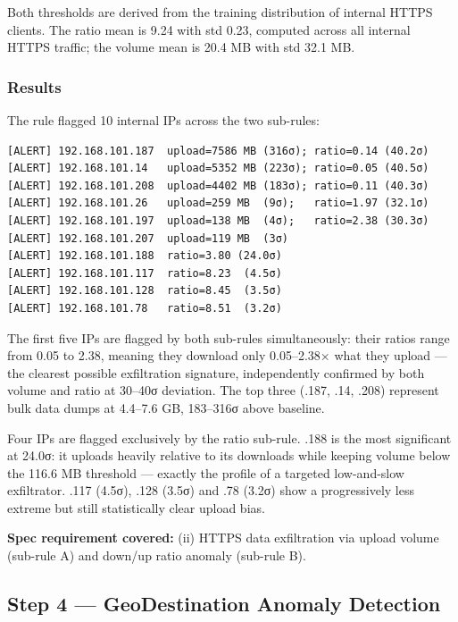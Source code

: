 \documentclass[
  11pt,
]{article}
\begin{document}
Both thresholds are derived from the training distribution of internal
HTTPS clients. The ratio mean is 9.24 with std 0.23, computed across all
internal HTTPS traffic; the volume mean is 20.4 MB with std 32.1 MB.

\subsubsection{Results}

The rule flagged 10 internal IPs across the two sub-rules:

\begin{verbatim}
[ALERT] 192.168.101.187  upload=7586 MB (316σ); ratio=0.14 (40.2σ)
[ALERT] 192.168.101.14   upload=5352 MB (223σ); ratio=0.05 (40.5σ)
[ALERT] 192.168.101.208  upload=4402 MB (183σ); ratio=0.11 (40.3σ)
[ALERT] 192.168.101.26   upload=259 MB  (9σ);   ratio=1.97 (32.1σ)
[ALERT] 192.168.101.197  upload=138 MB  (4σ);   ratio=2.38 (30.3σ)
[ALERT] 192.168.101.207  upload=119 MB  (3σ)
[ALERT] 192.168.101.188  ratio=3.80 (24.0σ)
[ALERT] 192.168.101.117  ratio=8.23  (4.5σ)
[ALERT] 192.168.101.128  ratio=8.45  (3.5σ)
[ALERT] 192.168.101.78   ratio=8.51  (3.2σ)
\end{verbatim}

The first five IPs are flagged by both sub-rules simultaneously: their
ratios range from 0.05 to 2.38, meaning they download only 0.05--2.38×
what they upload — the clearest possible exfiltration signature,
independently confirmed by both volume and ratio at 30--40σ deviation.
The top three (.187, .14, .208) represent bulk data dumps at 4.4--7.6 GB,
183--316σ above baseline.

Four IPs are flagged exclusively by the ratio sub-rule. .188 is the most
significant at 24.0σ: it uploads heavily relative to its downloads while
keeping volume below the 116.6 MB threshold — exactly the profile of a
targeted low-and-slow exfiltrator. .117 (4.5σ), .128 (3.5σ) and .78
(3.2σ) show a progressively less extreme but still statistically clear
upload bias.

\medskip
\noindent\colorbox{gray!12}{\parbox{\dimexpr\linewidth-2\fboxsep\relax}{\textbf{Spec requirement covered:} (ii) HTTPS data exfiltration via upload volume (sub-rule A) and down/up ratio anomaly (sub-rule B).}}

\hypertarget{geodestination-anomaly-detection}{%
\subsection{Step 4 — GeoDestination Anomaly Detection}\label{geodestination-anomaly-detection}}
\end{document}
